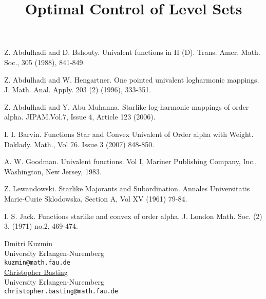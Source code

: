 \documentclass[article,A4,11pt]{llncs}%
\begin{document}

\begin{thebibliography}{10}
{\sc Z. Abdulhadi and D. Bshouty}. {Univalent functions in H (D)}. Trans. Amer. Math. Soc., 305 (1988), 841-849.

{\sc Z. Abdulhadi and W. Hengartner}. {One pointed univalent logharmonic mappings}. J. Math. Anal. Apply. 203 (2) (1996), 333-351.

{\sc Z. Abdulhadi and Y. Abu Muhanna}. {Starlike log-harmonic mappings of order alpha}. JIPAM.Vol.7, Issue 4, Article 123 (2006).

{\sc I. I. Barvin}. {Functions Star and Convex Univalent of Order alpha with Weight}. Doklady. Math., Vol 76. Issue 3 (2007) 848-850.

{\sc A. W. Goodman}. {Univalent functions}. Vol I, Mariner Publishing Company, Inc., Washington, New Jersey, 1983.

{\sc Z. Lewandowski}. {Starlike Majorants and Subordination}. Annales Universitatis Marie-Curie Sklodowska, Section A, Vol XV (1961) 79-84.

{\sc I. S. Jack}. {Functions starlike and convex of order alpha}. J. London Math. Soc. (2) 3, (1971) no.2, 469-474.
\end{thebibliography}

\title{Optimal Control of Level Sets}
 \author{} \institute{}
\maketitle
\begin{center}
{\large Dmitri Kuzmin}\\
University Erlangen-Nuremberg\\
{\tt kuzmin@math.fau.de}
\\ \vspace{4mm}
{\large \underline{Christopher Basting}}\\
University Erlangen-Nuremberg\\
{\tt christopher.basting@math.fau.de}
\end{center}
\end{document}
